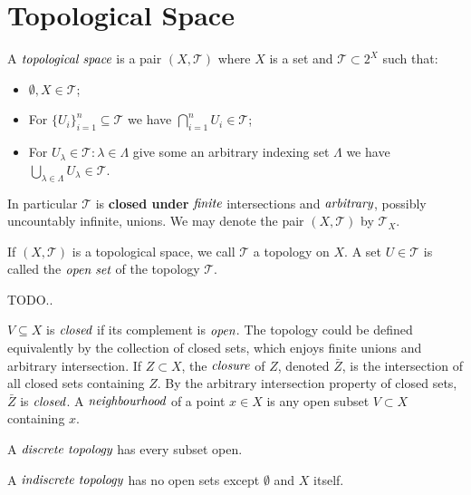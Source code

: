 
\section{Topological Space} %
\label{sec:topologicalspace}

\begin{defn}
	A $\emph{topological space}$ is a pair $(X, \mathcal{T})$
	where $X$ is a set and $\mathcal{T} \subset 2^{X}$ such that:
	\begin{itemize}
		\item $\emptyset, X \in \mathcal{T}$;
		\item For $\{U_i\}_{i=1}^{n} \subseteq \mathcal{T}$ we have 
			$\displaystyle \bigcap_{i=1}^{n} U_i \in \mathcal{T}$;
		\item For $U_{\lambda} \in \mathcal{T} : \lambda \in \Lambda$ give some
			an arbitrary indexing set $\Lambda$ we have
			$\displaystyle \bigcup_{\lambda \in \Lambda} U_{\lambda} \in \mathcal{T}$.
	\end{itemize}
	In particular $\mathcal{T}$ is \textbf{closed under} $\emph{finite}$ intersections
	and $\emph{arbitrary}$, possibly uncountably infinite, unions. We may denote
	the pair $(X, \mathcal{T})$ by $\mathcal{T}_{X}$.
\end{defn}

If $(X,\mathcal{T})$ is a topological space, we call $\mathcal{T}$
a topology on $X$. A set $U \in \mathcal{T}$ is called the
$\emph{open set}$ of the topology $\mathcal{T}$.

\begin{exmp}
	TODO..
\end{exmp}

$V \subseteq X$ is $\emph{closed}$ if its complement is $\emph{open}$.
The topology could be defined equivalently by the collection of closed
sets, which enjoys finite unions and arbitrary intersection.
If $Z \subset X$, the $\emph{closure}$ of $Z$, denoted $\bar{Z}$, is
the intersection of all closed sets containing $Z$. By the arbitrary
intersection property of closed sets, $\bar{Z}$ is $\emph{closed}$.
A $\emph{neighbourhood}$ of a point $x \in X$ is any open subset $V \subset X$
containing $x$.

\begin{defn}
	A $\emph{discrete topology}$ has every subset open.
\end{defn}

\begin{defn}
	A $\emph{indiscrete topology}$ has no open sets except $\emptyset$ and $X$ itself.
\end{defn}
